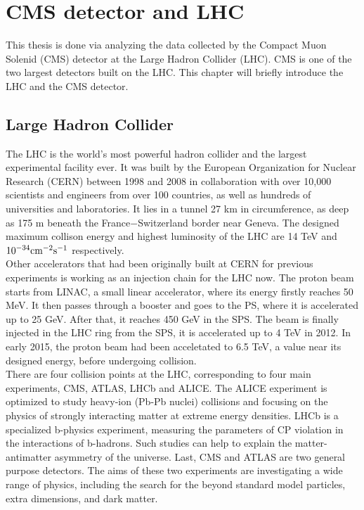 \chapter{CMS detector and LHC}
This thesis is done via analyzing the data collected by the Compact Muon Solenid (CMS) detector at the Large Hadron Collider (LHC). CMS is one of the two largest detectors built on the LHC. This chapter will briefly introduce the LHC and the CMS detector.

\section{Large Hadron Collider}
The LHC is the world's most powerful hadron collider and the largest experimental facility ever. It was built by the European Organization for Nuclear Research (CERN) between 1998 and 2008 in collaboration with over 10,000 scientists and engineers from over 100 countries, as well as hundreds of universities and laboratories. It lies in a tunnel 27 km in circumference, as deep as 175 m beneath the France$-$Switzerland border near Geneva. The designed maximum collison energy and highest luminosity of the LHC are 14 TeV and $\textup{10}^{-34} \textup{cm}^{-2}\textup{s}^{-1}$ respectively.\\
Other accelerators that had been originally built at CERN for previous experiments is working as an injection chain for the LHC now. The proton beam starts from LINAC, a small linear accelerator, where its energy firstly reaches 50 MeV. It then passes through a booster and goes to the PS, where it is accelerated up to 25 GeV. After that, it reaches 450 GeV in the SPS. The beam is finally injected in the LHC ring from the SPS, it is accelerated up to 4 TeV in 2012. In early 2015, the proton beam had been acceletated to 6.5 TeV, a value near its designed energy, before undergoing collision.\\
There are four collision points at the LHC, corresponding to four main experiments, CMS, ATLAS, LHCb and ALICE. The ALICE experiment is optimized to study heavy-ion (Pb-Pb nuclei) collisions and focusing on the physics of strongly interacting matter at extreme energy densities. LHCb is a specialized b-physics experiment, measuring the parameters of CP violation in the interactions of b-hadrons. Such studies can help to explain the matter-antimatter asymmetry of the universe. Last, CMS and ATLAS are two general purpose detectors. The aims of these two experiments are investigating a wide range of physics, including the search for the beyond standard model particles, extra dimensions, and dark matter.\\

